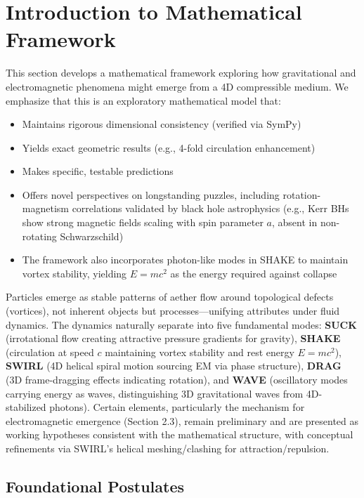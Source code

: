 \section{Introduction to Mathematical Framework}

This section develops a mathematical framework exploring how gravitational and electromagnetic phenomena might emerge from a 4D compressible medium. We emphasize that this is an exploratory mathematical model that:
\begin{itemize}
\item Maintains rigorous dimensional consistency (verified via SymPy)
\item Yields exact geometric results (e.g., 4-fold circulation enhancement)
\item Makes specific, testable predictions
\item Offers novel perspectives on longstanding puzzles, including rotation-magnetism correlations validated by black hole astrophysics (e.g., Kerr BHs show strong magnetic fields scaling with spin parameter $a$, absent in non-rotating Schwarzschild)
\item The framework also incorporates photon-like modes in SHAKE to maintain vortex stability, yielding $E=mc^2$ as the energy required against collapse
\end{itemize}
Particles emerge as stable patterns of aether flow around topological defects (vortices), not inherent objects but processes---unifying attributes under fluid dynamics. The dynamics naturally separate into five fundamental modes: \textbf{SUCK} (irrotational flow creating attractive pressure gradients for gravity), \textbf{SHAKE} (circulation at speed $c$ maintaining vortex stability and rest energy $E=mc^2$), \textbf{SWIRL} (4D helical spiral motion sourcing EM via phase structure), \textbf{DRAG} (3D frame-dragging effects indicating rotation), and \textbf{WAVE} (oscillatory modes carrying energy as waves, distinguishing 3D gravitational waves from 4D-stabilized photons). Certain elements, particularly the mechanism for electromagnetic emergence (Section 2.3), remain preliminary and are presented as working hypotheses consistent with the mathematical structure, with conceptual refinements via SWIRL's helical meshing/clashing for attraction/repulsion.

\subsection{Foundational Postulates}

